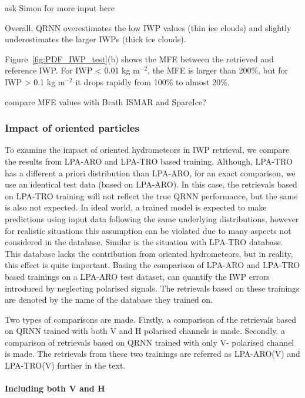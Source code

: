 \documentclass[amt, manuscript]{copernicus}
\newcommand{\todo}[1]{{\color{red} #1}}
\begin{document}
\todo{ask Simon for more input here}
 
Overall, QRNN overestimates the low IWP values (thin ice clouds) and  slightly underestimates the larger IWPs (thick ice clouds). 


Figure~\ref{fig:PDF_IWP_test}(b) shows the MFE between the retrieved and reference IWP. For IWP < 0.01\,\,kg m$^{-2}$, the MFE is larger than 200\%, but for IWP > 0.1\,\,kg m$^{-2}$ it drops rapidly from 100\% to almost 20\%. 

\todo{compare MFE values with Brath ISMAR  and SpareIce?}

  

\subsubsection{Impact of oriented particles}
%
To examine the impact of oriented hydrometeors in IWP retrieval, we compare the results from LPA-ARO and LPA-TRO based training. Although, LPA-TRO has a different a priori distribution than LPA-ARO, for an exact comparison, we use an identical test data (based on LPA-ARO). In this case, the retrievals based on LPA-TRO training will not reflect the true QRNN performance, but the same is also not expected. In ideal world, a trained model is expected to make predictions using input data following the same underlying distributions, however for realistic situations this assumption can be violated due to many aspects not considered in the database. Similar is the situation with LPA-TRO database. This database lacks the contribution from oriented hydrometeors, but in reality, this effect is quite important. Basing the comparison of LPA-ARO and LPA-TRO based trainings on a LPA-ARO test dataset, can quantify the IWP errors introduced by neglecting polarised signals. The retrievals based on these trainings are denoted by the name of the database they trained on.

Two types of comparisons are made. Firstly, a comparison of the retrievals based on QRNN trained with both V and H polarised channels  is made. Secondly, a comparison of retrievals based on QRNN trained with only V- polarised channel is made. The retrievals from these two trainings are referred as LPA-ARO(V) and LPA-TRO(V) further in the text.  

\paragraph{Including both V and H}
\label{sec:results_vh}
\end{document}
